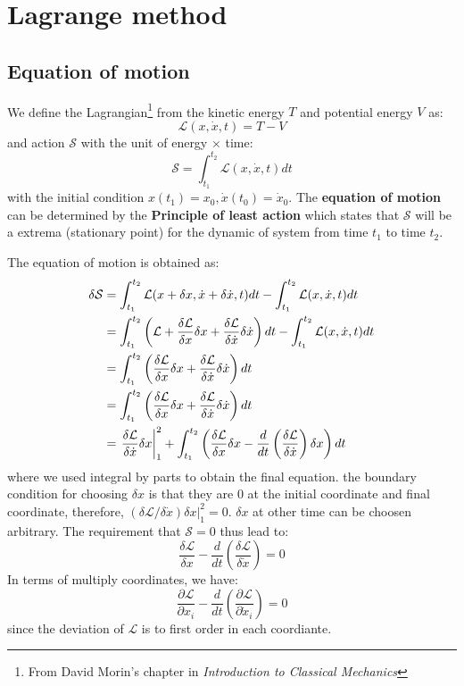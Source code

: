 \documentclass{article}
\renewcommand{\L}{\mathcal{L}}
\renewcommand{\S}{\mathcal{S}}
\newcommand{\dotx}{\dot{x}}
\begin{document}
\section{Lagrange method}

\subsection{Equation of motion}
We define the Lagrangian\footnote{From David Morin's chapter in \emph{Introduction to Classical Mechanics}} from the kinetic energy $T$ and potential energy $V$ as:
\begin{equation}
    \L(x,\dot{x},t) = T - V 
\end{equation}
and action $\S$ with the unit of energy $\times$ time:
\begin{equation}
    \S = \int_{t_1}^{t_2} \L(x,\dot{x},t) dt
\end{equation}
with the initial condition $x(t_1) = x_0, \dot{x}(t_0) = \dot{x}_0$. 
The \textbf{equation of motion} can be determined by the 
\textbf{Principle of least action} which states that $\S$ will be 
a extrema (stationary point) for the dynamic of system from time
$t_1$ to time $t_2$. 

The equation of motion is obtained as:
\begin{align}
    \delta\S &= \int_{t_1}^{t_2} \L(x+\delta x,\dotx + \delta \dotx,t) dt - \int_{t_1}^{t_2} \L(x,\dot{x},t) dt \notag \\
            &= \int_{t_1}^{t_2} \left( \L + \frac{\delta \L}{\delta x} \delta x + \frac{\delta \L}{\delta \dotx} \delta \dotx \right) dt - \int_{t_1}^{t_2} \L(x,\dot{x},t) dt \notag \\
            &= \int_{t_1}^{t_2}\left( \frac{\delta \L}{\delta x} \delta x + \frac{\delta \L}{\delta \dotx} \delta \dotx \right) dt \notag \\
            &= \int_{t_1}^{t_2}\left( \frac{\delta \L}{\delta x} \delta x + \frac{\delta \L}{\delta \dotx} \delta \dotx \right) dt \notag \\
            &= \left. \frac{\delta \L}{\delta \dotx} \delta x \right|_1^2
            + \int_{t_1}^{t_2}\left( \frac{\delta \L}{\delta x} \delta x - \frac{d}{dt}\left( \frac{\delta \L}{\delta \dotx} \right) \delta x \right) dt \label{eom} \\
\end{align}
where we used integral by parts to obtain the final equation. the boundary condition for choosing $\delta x$ is that they are $0$ at the initial coordinate and 
final coordinate, therefore, $ (\delta \L / \delta \dotx) \delta x |_1^2 = 0$. $\delta x$ at other time can be choosen arbitrary. The requirement that
$\S = 0$ thus lead to:
\begin{equation}
    \frac{\delta \L}{\delta x} - \frac{d}{dt}\left( \frac{\delta \L}{\delta \dotx} \right) = 0
\end{equation}
In terms of multiply coordinates, we have:
\begin{equation}
    \frac{\partial \L}{\partial x_i} - \frac{d}{dt}\left( \frac{\partial \L}{\partial \dotx_i} \right) = 0
\end{equation}
since the deviation of $\L$ is to first order in each coordiante.
\end{document}
